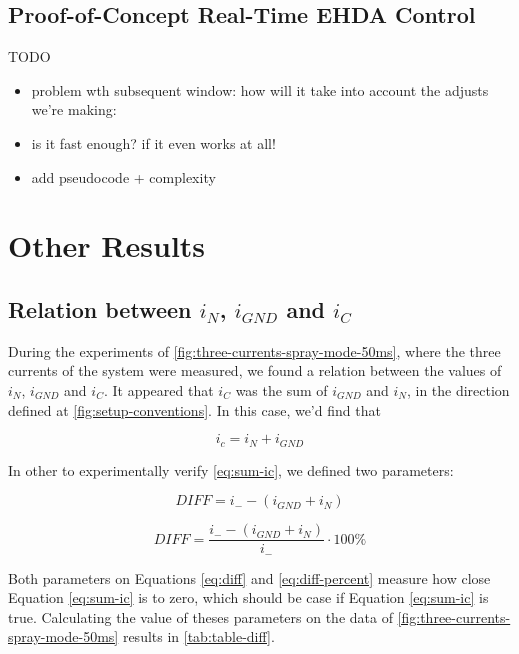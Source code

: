 \documentclass[oneside,12pt]{article}
\begin{document}
\subsection{Proof-of-Concept Real-Time EHDA Control}
TODO

\begin{itemize}
    \item problem wth subsequent window: how will it take into account the adjusts we're making:
    \item is it fast enough? if it even works at all!
    \item add pseudocode + complexity
\end{itemize}

\section{Other Results}\label{sec:utils}

\subsection{Relation between $i_N$, $i_{GND}$ and $i_C$}

During the experiments of \autoref{fig:three-currents-spray-mode-50ms}, where the three currents of the system
were measured, we found a relation between the values of
$i_N$, $i_{GND}$ and $i_C$. It appeared that $i_C$ was the sum of $i_{GND}$ and $i_N$, in the direction defined at
\autoref{fig:setup-conventions}. In this case, we'd find that

\begin{equation} \label{eq:sum-ic}
    i_c = i_N + i_{GND}
\end{equation}

In other to experimentally verify \autoref{eq:sum-ic}, we defined two parameters:

\begin{equation} \label{eq:diff}
    DIFF = i_- - \left(i_{GND} + i_N\right)
\end{equation}

\begin{equation} \label{eq:diff-percent}
    DIFF = \frac{i_- - \left(i_{GND} + i_N\right)}{i_-} \cdot 100\%
\end{equation}

Both parameters on Equations \ref{eq:diff} and \ref{eq:diff-percent} measure how close Equation \ref{eq:sum-ic} is to zero,
which should be case if Equation \ref{eq:sum-ic} is true. Calculating the value of theses parameters on the data of \autoref{fig:three-currents-spray-mode-50ms}
results in \autoref{tab:table-diff}.
\end{document}
